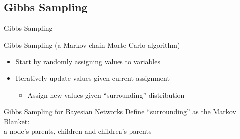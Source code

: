 \documentclass[14pt]{beamer}
\begin{document}
\subsection{Gibbs Sampling}
\begin{frame}{Gibbs Sampling}
	\begin{block}{Gibbs Sampling (a Markov chain Monte Carlo algorithm)}
		\begin{itemize}
			\item Start by randomly assigning values to variables
			\item Iteratively update values given current assignment
				\begin{itemize}
					\item Assign new values given ``surrounding'' distribution
				\end{itemize}
		\end{itemize}
	\end{block}
	\pause
	\begin{block}{Gibbs Sampling for Bayesian Networks}
		Define ``surrounding'' as the \alert{Markov Blanket}: \\
		\tab\tab a node's parents, children and children's parents
	\end{block}
\end{frame}
\end{document}

